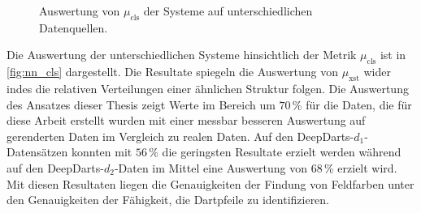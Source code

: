 \begin{figure}
    \centering
    \caption{Auswertung von $\mu_\text{cls}$ der Systeme auf unterschiedlichen Datenquellen.}
    \label{fig:nn_cls}
\end{figure}

Die Auswertung der unterschiedlichen Systeme hinsichtlich der Metrik $\mu_\text{cls}$ ist in \autoref{fig:nn_cls} dargestellt. Die Resultate spiegeln die Auswertung von $\mu_\text{xst}$ wider indes die relativen Verteilungen einer ähnlichen Struktur folgen. Die Auswertung des Ansatzes dieser Thesis zeigt Werte im Bereich um $70\,\%$ für die Daten, die für diese Arbeit erstellt wurden mit einer messbar besseren Auswertung auf gerenderten Daten im Vergleich zu realen Daten. Auf den DeepDarts-$d_1$-Datensätzen konnten mit $56\,\%$ die geringsten Resultate erzielt werden während auf den DeepDarts-$d_2$-Daten im Mittel eine Auswertung von $68\,\%$ erzielt wird. Mit diesen Resultaten liegen die Genauigkeiten der Findung von Feldfarben unter den Genauigkeiten der Fähigkeit, die Dartpfeile zu identifizieren.


